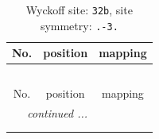 \documentclass[fleqn,8pt]{jsarticle}
\begin{document}
\renewcommand{\arraystretch}{1.2}
\begin{longtable}{ccc}
\caption{Wyckoff site: {\tt 32b}, site symmetry: {\tt .-3.}}
 \\
 \hline \hline
No. & position & mapping \\ \hline \endfirsthead

\multicolumn{2}{l}{\tablename\ \thetable{}} \\
 \hline \hline
No. & position & mapping \\ \hline \endhead

 \hline \hline
\multicolumn{2}{r}{\footnotesize\it continued ...} \\ \endfoot

 \hline \hline
\multicolumn{2}{r}{} \\ \endlastfoot


\end{longtable}
\end{document}
